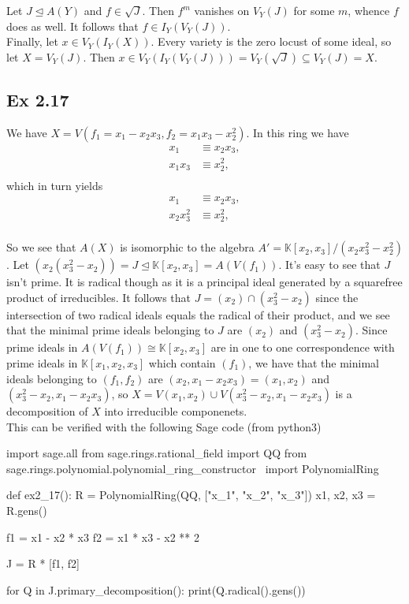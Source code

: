 \documentclass{article}
\theoremstyle{definition}
\newcommand{\K}{\mathbb{K}}
\begin{document}
Let $J \unlhd A(Y)$ and $f \in \sqrt{J}$. Then $f^m$ vanishes on $V_{Y}(J)$ for some $m$,
whence $f$ does as well. It follows that $f \in I_{Y}(V_{Y}(J))$. \\

Finally, let $x \in V_{Y}(I_Y(X))$. Every variety is the zero locust of some
ideal, so let $X = V_{Y}(J)$. Then $x \in V_Y(I_Y(V_Y(J))) = V_Y(\sqrt{J})
\subseteq V_{Y}(J) = X$.


\subsection*{Ex 2.17}

We have $X = V\left(f_1 = x_1 - x_2x_3, f_2 = x_1x_3 - x_2^{2}\right)$. In this ring we have
\begin{align*}
	x_1
	&\equiv
	x_2x_3, \\
	x_1x_3 
	&\equiv
	x_2^{2}, \\
\end{align*}
which in turn yields
\begin{align*}
	x_1
	&\equiv
	x_2x_3, \\
	x_2x_3^{2} 
	&\equiv
	x_2^{2}, \\
\end{align*}

So we see that $A(X)$ is isomorphic to the algebra $A' = \K[x_2,
x_3]/(x_2x_3^{2} - x_2^{2})$. Let $(x_2(x_3^{2} - x_2)) = J \unlhd \K[x_2, x_3]
= A(V(f_1))$. It's easy to see that $J$ isn't prime. It is radical though as it
is a principal ideal generated by a squarefree product of irreducibles. It
follows that $J = (x_2) \cap (x_3^{2} - x_2)$ since the intersection of two
radical ideals equals the radical of their product, and we see that the minimal
prime ideals belonging to $J$ are $(x_2)$ and $(x_3^{2} - x_2)$. Since prime
ideals in $A(V(f_1)) \cong \K[x_2, x_3]$ are in one to one correspondence with
prime ideals in $\K[x_1, x_2, x_3]$ which contain $(f_1)$, we have that the
minimal ideals belonging to $(f_1, f_2)$ are $(x_2, x_1 - x_2x_3) = (x_1, x_2)$
and $(x_3^{2} - x_2, x_1 - x_2x_3)$, so $X = V(x_1, x_2) \cup V(x_3^{2} - x_2,
x_1 - x_2x_3)$ is a decomposition of $X$ into irreducible componenets. \\

This can be verified with the following Sage code (from python3)

\begin{python}
import sage.all
from sage.rings.rational_field import QQ
from sage.rings.polynomial.polynomial_ring_constructor \
	import PolynomialRing

def ex2_17(): 
    R = PolynomialRing(QQ, ["x_1", "x_2", "x_3"])
    x1, x2, x3 = R.gens()

    f1 = x1 - x2 * x3
    f2 = x1 * x3 - x2 ** 2
    
    J = R * [f1, f2]

    for Q in J.primary_decomposition():
        print(Q.radical().gens())
\end{python}
\end{document}
